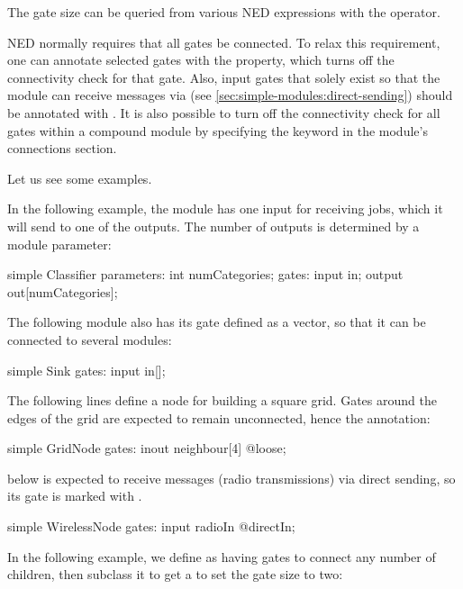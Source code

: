 The gate size can be queried from various NED expressions with the
 operator.

NED normally requires that all gates be connected. To relax this
requirement, one can annotate selected gates with the 
property, which turns off the connectivity check for that gate. Also, input
gates that solely exist so that the module can receive messages via
 (see \ref{sec:simple-modules:direct-sending}) should
be annotated with . It is also possible to turn off the connectivity
check for all gates within a compound module by specifying the
 keyword in the module's connections section.

Let us see some examples.

In the following example, the  module has one input for
receiving jobs, which it will send to one of the outputs. The number of
outputs is determined by a module parameter:

\begin{ned}
simple Classifier {
    parameters:
        int numCategories;
    gates:
        input in;
        output out[numCategories];
}
\end{ned}

The following  module also has its  gate defined
as a vector, so that it can be connected to several modules:

\begin{ned}
simple Sink {
    gates:
        input in[];
}
\end{ned}

The following lines define a node for building a square grid. Gates around
the edges of the grid are expected to remain unconnected, hence the
 annotation:

\begin{ned}
simple GridNode {
    gates:
        inout neighbour[4] @loose;
}
\end{ned}

 below is expected to receive messages (radio transmissions)
via direct sending, so its  gate is marked with .

\begin{ned}
simple WirelessNode {
    gates:
        input radioIn @directIn;
}
\end{ned}

In the following example, we define  as having gates to connect
any number of children, then subclass it to get a  to
set the gate size to two:

